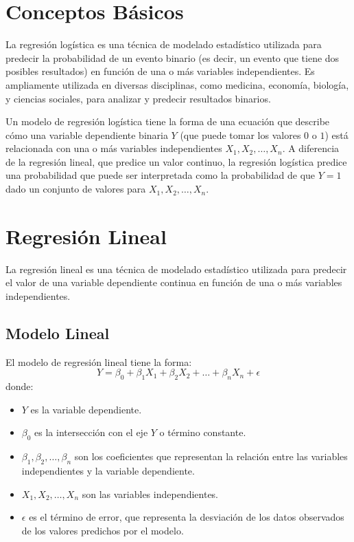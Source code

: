 
\section{Conceptos Básicos}

La regresión logística es una técnica de modelado estadístico utilizada para predecir la probabilidad de un evento binario (es decir, un evento que tiene dos posibles resultados) en función de una o más variables independientes. Es ampliamente utilizada en diversas disciplinas, como medicina, economía, biología, y ciencias sociales, para analizar y predecir resultados binarios.

Un modelo de regresión logística tiene la forma de una ecuación que describe cómo una variable dependiente binaria $Y$ (que puede tomar los valores $0$ o $1$) está relacionada con una o más variables independientes $X_1, X_2, \ldots, X_n$. A diferencia de la regresión lineal, que predice un valor continuo, la regresión logística predice una probabilidad que puede ser interpretada como la probabilidad de que $Y=1$ dado un conjunto de valores para $X_1, X_2, \ldots, X_n$.

\section{Regresión Lineal}

La regresión lineal es una técnica de modelado estadístico utilizada para predecir el valor de una variable dependiente continua en función de una o más variables independientes.

\subsection*{Modelo Lineal}

El modelo de regresión lineal tiene la forma:
\begin{equation}
Y = \beta_0 + \beta_1 X_1 + \beta_2 X_2 + \ldots + \beta_n X_n + \epsilon
\end{equation}
donde:
\begin{itemize}
    \item $Y$ es la variable dependiente.
    \item $\beta_0$ es la intersección con el eje $Y$ o término constante.
    \item $\beta_1, \beta_2, \ldots, \beta_n$ son los coeficientes que representan la relación entre las variables independientes y la variable dependiente.
    \item $X_1, X_2, \ldots, X_n$ son las variables independientes.
    \item $\epsilon$ es el término de error, que representa la desviación de los datos observados de los valores predichos por el modelo.
\end{itemize}

